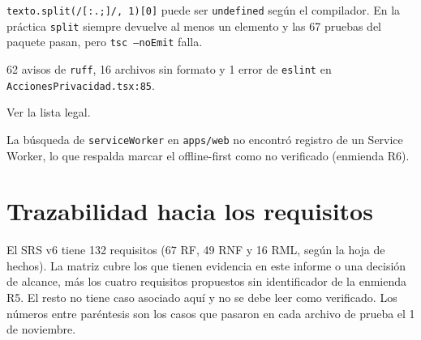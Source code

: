 \documentclass[11pt,letterpaper]{article}
\newcommand{\ruta}[1]{\texttt{\small #1}}
\begin{document}
\begin{description}
  \ruta{texto.split(/\allowbreak{}[:.;]/\allowbreak{}, 1)[0]} puede ser \ruta{undefined} según el compilador. En la práctica
  \ruta{split} siempre devuelve al menos un elemento y las 67 pruebas del paquete pasan, pero
  \ruta{tsc --noEmit} falla.
  \item[H6 (baja). Análisis estático.] 62 avisos de \ruta{ruff}, 16 archivos sin formato y 1 error de
  \ruta{eslint} en \ruta{AccionesPrivacidad.tsx:85}.
  \item[O1 (observación). Consentimiento solo en el cliente.] Ver la lista legal.
  \item[O2 (observación). Sin Service Worker.] La búsqueda de \ruta{serviceWorker} en \ruta{apps/\allowbreak{}web} no
  encontró registro de un Service Worker, lo que respalda marcar el offline-first como no verificado (enmienda
  R6).
\end{description}

\section{Trazabilidad hacia los requisitos}

El SRS v6 tiene 132 requisitos (67 RF, 49 RNF y 16 RML, según la hoja de hechos). La matriz cubre los que
tienen evidencia en este informe o una decisión de alcance, más los cuatro requisitos propuestos sin
identificador de la enmienda R5. El resto no tiene caso asociado aquí y no se debe leer como verificado. Los
números entre paréntesis son los casos que pasaron en cada archivo de prueba el 1 de noviembre.
\end{document}
